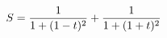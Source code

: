 \documentclass[preview]{standalone}
\begin{document}
\begin{align*}
\special{dvisvgm:raw <g id='unique000'>}S=\frac{1}{1+(1-t)^2}+\frac{1}{1+(1+t)^2}\special{dvisvgm:raw </g>}
\end{align*}
\end{document}
